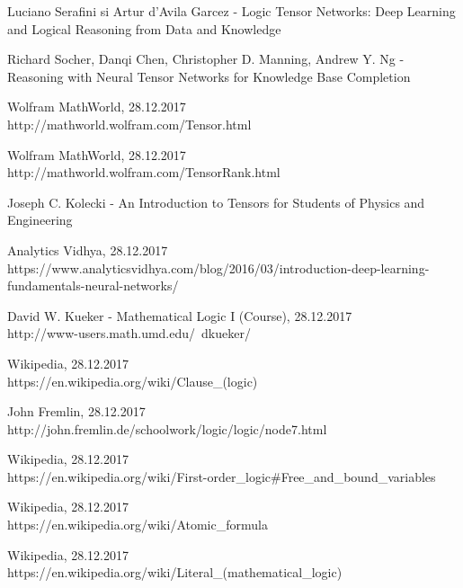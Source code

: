\documentclass{article}
\begin{document}
\begin{thebibliography}{9}
	Luciano Serafini si Artur d'Avila Garcez - Logic Tensor Networks: Deep Learning and Logical Reasoning from Data and Knowledge
	
	Richard Socher, Danqi Chen, Christopher D. Manning, Andrew Y. Ng - Reasoning with Neural Tensor Networks for Knowledge Base Completion

	Wolfram MathWorld, 28.12.2017\\
	http://mathworld.wolfram.com/Tensor.html

	Wolfram MathWorld, 28.12.2017\\
	http://mathworld.wolfram.com/TensorRank.html
	
	Joseph C. Kolecki - An Introduction to Tensors for Students of Physics and Engineering

	Analytics Vidhya, 28.12.2017\\
	https://www.analyticsvidhya.com/blog/2016/03/introduction-deep-learning-fundamentals-neural-networks/
	
	David W. Kueker - Mathematical Logic I (Course), 28.12.2017\\
	http://www-users.math.umd.edu/~dkueker/
	
	Wikipedia, 28.12.2017\\
	https://en.wikipedia.org/wiki/Clause\_(logic)
	
	John Fremlin, 28.12.2017\\
	http://john.fremlin.de/schoolwork/logic/logic/node7.html
	
	Wikipedia, 28.12.2017\\
	https://en.wikipedia.org/wiki/First-order\_logic\#Free\_and\_bound\_variables

	Wikipedia, 28.12.2017\\
	https://en.wikipedia.org/wiki/Atomic\_formula
	
	Wikipedia, 28.12.2017\\
	https://en.wikipedia.org/wiki/Literal\_(mathematical\_logic)

\end{thebibliography}
\end{document}
